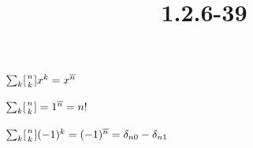 \documentclass{article}
\title{1.2.6-39}
\begin{document}
\maketitle

$\sum_{k} [{n \atop k}]x^k = x^{\overline{n}}$

$\sum_{k} [{n \atop k}] = 1^{\overline{n}} = n!$

$\sum_{k} [{n \atop k}](-1)^k = (-1)^{\overline{n}} = \delta_{n0} - \delta_{n1}$
\end{document}
